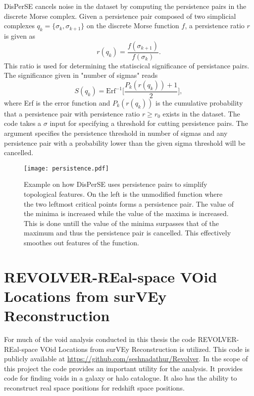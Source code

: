 DisPerSE cancels noise in the dataset by computing the persistence pairs
in the discrete Morse complex. Given a persistence pair composed of two
simplicial complexes $q_k=\{\sigma_k,\sigma_{k+1}\}$ on the discrete Morse
function $f$, a persistence ratio $r$ is given as
\begin{equation}
    r(q_k)=\frac{f(\sigma_{k+1})}{f(\sigma_k)}.
\end{equation}
This ratio is used for determining the statiscical significance of persistance
pairs. The significance given in "number of sigmas" reads 
\begin{equation}
    S(q_k)=\mathrm{Erf}^{-1}\Big[\frac{P_k(r(q_k))+1}{2}\Big],
\end{equation}
where Erf is the error function and $P_k(r(q_k))$ is the cumulative probability
that a persistence pair with persistence ratio $r\geq r_0$ exists in the
dataset. The code takes a $\sigma$ input for specifying a threshold for cutting
persistence pairs. The argument specifies the persistence threshold in number of
sigmas and any persistence pair with a probability lower than the given sigma
threshold will be cancelled.


\begin{figure}
   \texttt{[image: persistence.pdf]}
   \caption{Example on how DisPerSE uses persistence pairs to simplify topological features. On the left is the unmodified function where the two leftmost critical points forms a persistence pair. The value of the minima is increased while the value of the maxima is increased. This is done untill the value of the minima surpasses that of the maximum and thus the persistence pair is cancelled. This effectively smoothes out features of the function.}
   \label{fig:persistence}
\end{figure}

\section{REVOLVER-REal-space VOid Locations from surVEy Reconstruction}
For much of the void analysis conducted in this thesis the code
REVOLVER-REal-space VOid Locations from surVEy Reconstruction is utilized. This
code is publicly available at \url{https://github.com/seshnadathur/Revolver}.
In the scope of this project the code provides an important utility for the
analysis. It provides code for finding voids in a galaxy or halo catalogue. It also has the ability
to reconstruct real space positions for redshift space positions.
